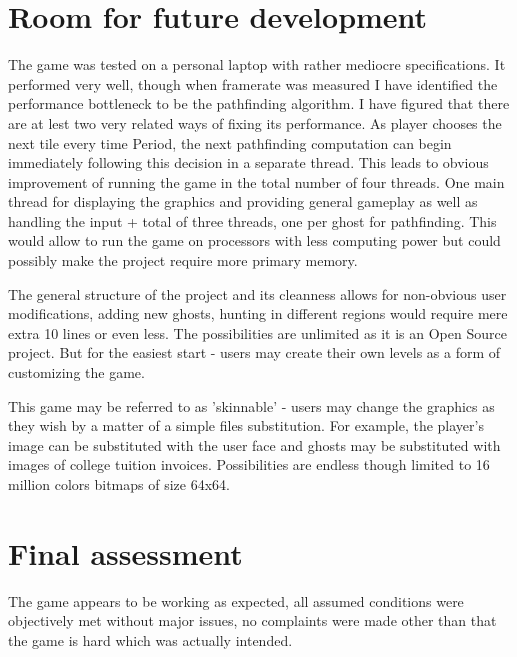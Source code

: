 \documentclass[11pt,a4paper,notitlepage]{report}
\begin{document}
		\section{Room for future development}
			The game was tested on a personal laptop with rather mediocre specifications. It performed very well, though when framerate was measured I have identified the performance bottleneck to be the pathfinding algorithm. I have figured that there are at lest two very related ways of fixing its performance. As player chooses the next tile every time Period, the next pathfinding computation can begin immediately following this decision in a separate thread. This leads to obvious improvement of running the game in the total number of four threads. One main thread for displaying the graphics and providing general gameplay as well as handling the input + total of three threads, one per ghost for pathfinding. This would allow to run the game on processors with less computing power but could possibly make the project require more primary memory.
			
			The general structure of the project and its cleanness allows for non-obvious user modifications, adding new ghosts, hunting in different regions would require mere extra 10 lines or even less. The possibilities are unlimited as it is an Open Source project. But for the easiest start - users may create their own levels as a form of customizing the game.
			
			This game may be referred to as 'skinnable' - users may change the graphics as they wish by a matter of a simple files substitution. For example, the player's image can be substituted with the user face and ghosts may be substituted with images of college tuition invoices. Possibilities are endless though limited to 16 million colors bitmaps of size 64x64. 
		\section{Final assessment}
			The game appears to be working as expected, all assumed conditions were objectively met without major issues, no complaints were made other than that the game is hard which was actually intended.
\end{document}
